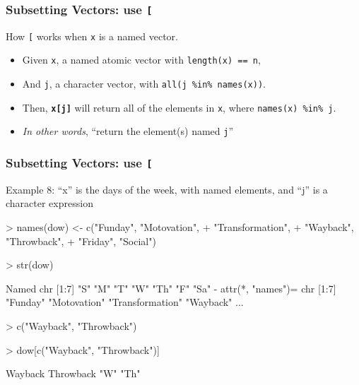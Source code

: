 \documentclass{beamer}
\newcommand{\R}[1]{\texttt{#1}}
\begin{document}
\begin{frame}[fragile]
\frametitle{Subsetting Vectors: use \R{[}}

How \R{[} works when \R{x} is a named vector.
\begin{itemize}
\item Given \R{x}, a named atomic vector with \R{length(x) == n},
\item And \R{j}, a character vector, with \R{all(j \%in\% names(x))}.
\item Then, \R{\textbf{x[j]}} will return all of the elements in \R{x}, where \R{names(x) \%in\% j}.
\item \textit{In other words}, ``return the element(s) named \R{j}''
\end{itemize}

\end{frame}



\begin{frame}[fragile]
\frametitle{Subsetting Vectors: use \R{[}}

Example 8: ``x'' is the days of the week, with named elements, and ``j'' is a character expression
\pause
\begin{Schunk}
\begin{Sinput}
> names(dow) <- c("Funday", "Motovation", 
+                 "Transformation", 
+                 "Wayback", "Throwback", 
+                 "Friday", "Social")
\end{Sinput}
\end{Schunk}
\pause
\begin{Schunk}
\begin{Sinput}
> str(dow)
\end{Sinput}
\begin{Soutput}
 Named chr [1:7] "S" "M" "T" "W" "Th" "F" "Sa"
 - attr(*, "names")= chr [1:7] "Funday" "Motovation" "Transformation" "Wayback" ...
\end{Soutput}
\end{Schunk}
\pause
\begin{Schunk}
\begin{Sinput}
> c("Wayback", "Throwback")
\end{Sinput}
\end{Schunk}
\pause
\begin{Schunk}
\begin{Sinput}
> dow[c("Wayback", "Throwback")]
\end{Sinput}
\end{Schunk}
\pause
\begin{Schunk}
\begin{Soutput}
  Wayback Throwback 
      "W"      "Th" 
\end{Soutput}
\end{Schunk}

\end{frame}
\end{document}
